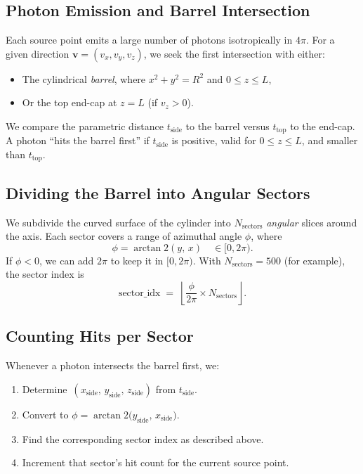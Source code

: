 \documentclass[11pt]{article}
\begin{document}
\subsection{Photon Emission and Barrel Intersection}
Each source point emits a large number of photons isotropically in \(4\pi\). For a given direction 
\(\boldsymbol{v} = (v_x, v_y, v_z)\), we seek the first intersection with either:
\begin{itemize}
  \item The cylindrical \emph{barrel}, where \(x^2 + y^2 = R^2\) and \(0 \le z \le L\), 
  \item Or the top end-cap at \(z=L\) (if \(v_z>0\)).
\end{itemize}
We compare the parametric distance \(t_{\mathrm{side}}\) to the barrel versus \(t_{\mathrm{top}}\) to the end-cap. A photon ``hits the barrel first'' if \(t_{\mathrm{side}} \) is positive, valid for \(0 \le z \le L\), and smaller than \(t_{\mathrm{top}}\).

\subsection{Dividing the Barrel into Angular Sectors}
We subdivide the curved surface of the cylinder into \(N_{\mathrm{sectors}}\) \emph{angular} slices around the axis. Each sector covers a range of azimuthal angle \(\phi\), where
\[
\phi = \arctan2(y,\, x) \quad\in [0, 2\pi).
\]
If \(\phi < 0\), we can add \(2\pi\) to keep it in \([0,2\pi)\). With \(N_{\mathrm{sectors}}=500\) (for example), the sector index is
\[
\text{sector\_idx} \;=\; \left\lfloor \frac{\phi}{2\pi} \times N_{\mathrm{sectors}} \right\rfloor.
\]

\subsection{Counting Hits per Sector}
Whenever a photon intersects the barrel first, we:
\begin{enumerate}
  \item Determine \(\,(x_{\mathrm{side}},\,y_{\mathrm{side}},\,z_{\mathrm{side}})\) from \(t_{\mathrm{side}}\).
  \item Convert to \(\phi = \arctan2\bigl(y_{\mathrm{side}},\,x_{\mathrm{side}}\bigr)\).
  \item Find the corresponding sector index as described above.
  \item Increment that sector's hit count for the current source point.
\end{enumerate}
\end{document}
